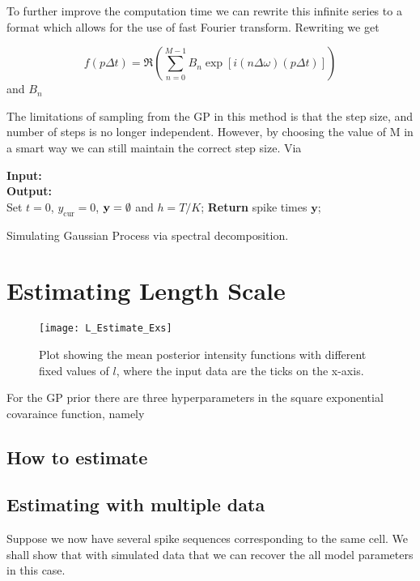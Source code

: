 \documentclass[../main.tex]{subfiles}
\begin{document}
To further improve the computation time we can rewrite this infinite series to a format which allows for the use of fast Fourier transform. Rewriting we get

$$
f(p \Delta t) = \Re \left( \sum^{M-1}_{n=0} B_n \exp \left[i (n\Delta \omega ) (p \Delta t) \right] \right)
$$
and $B_n$ 

The limitations of sampling from the GP in this method is that the step size, and number of steps is no longer independent. However, by choosing the value of M in a smart way we can still maintain the correct step size. Via 

\begin{algorithm}[t]
\DontPrintSemicolon
\textbf{Input:}\\ 
\textbf{Output:}\\
\vspace{0.3cm}
Set $t=0$, $y_{\mathrm{cur}} = 0$, $\mathbf{y} = \emptyset$ and $h = T/K$; \;
\textbf{Return} spike times $\mathbf{y}$; \;
\caption{Simulating Gaussian Process via spectral decomposition.}
\end{algorithm}


\section{Estimating Length Scale}
\begin{figure}[t]
	\texttt{[image: L\_Estimate\_Exs]}
	\caption{Plot showing the mean posterior intensity functions with different fixed values of $l$, where the input data are the ticks on the x-axis.}
	\label{fig: LEstimate_EqualLikeli}
\end{figure}

For the GP prior there are three hyperparameters in the square exponential covaraince function, namely 
\subsection{How to estimate}
\subsection{Estimating with multiple data}
Suppose we now have several spike sequences corresponding to the same cell. We shall show that with simulated data that we can recover the all model parameters in this case. 
\end{document}
